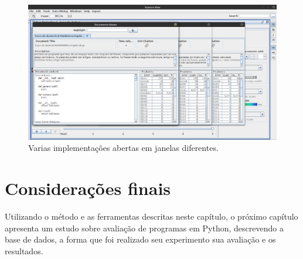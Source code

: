 		\begin{figure}[hb]
			\centering
			\includegraphics[width=.95\linewidth]{imagem/ladoAlado}
			\caption{Varias implementações abertas em janelas diferentes.}
			\label{fig:ladoAlado}
		\end{figure}
		

	\section{Considerações finais}
	
		Utilizando o método e as ferramentas descritas neste capítulo,
		o próximo capítulo apresenta um estudo sobre avaliação de programas em Python,
		descrevendo a base de dados, a forma que foi realizado
		seu experimento sua avaliação e os resultados.